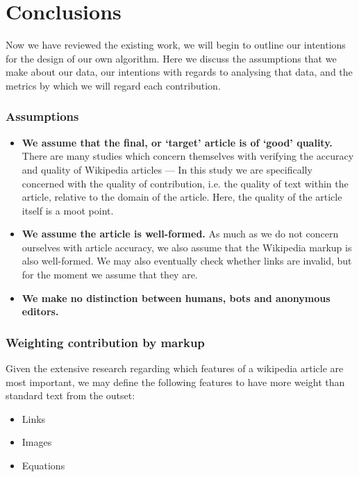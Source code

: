 \documentclass[a4paper,11pt,twoside,notitlepage]{article}
\begin{document}

        \section{Conclusions}
        Now we have reviewed the existing work, we will begin to
        outline our intentions for the design of our own algorithm. Here
        we discuss the assumptions that we make about our data, our
        intentions with regards to analysing that data, and the
        metrics by which we will regard each contribution.

        \subsubsection*{Assumptions}
        \begin{itemize}
          \item \textbf{We assume that the final, or `target' article
            is of `good' quality.} There are many studies which concern
            themselves with verifying the accuracy and quality of
            Wikipedia articles --- In this study we are specifically
            concerned with the quality of contribution, i.e. the
            quality of text within the article, relative to the domain
            of the article. Here, the quality of the article itself is a
            moot point.
          \item \textbf{We assume the article is well-formed.} As much
            as we do not concern ourselves with article accuracy, we
            also assume that the Wikipedia markup is also
            well-formed. We may also eventually check whether links
            are invalid, but for the moment we assume that they are.
          \item \textbf{We make no distinction between humans, bots
            and anonymous editors.}
        \end{itemize}
        
        \subsubsection*{Weighting contribution by markup}
        Given the extensive research regarding which features of a
        wikipedia article are most important, we may define the
        following features to have more weight than standard text from
        the outset:
        \begin{itemize}
          \item Links
          \item Images
          \item Equations
        \end{itemize}
\end{document}
